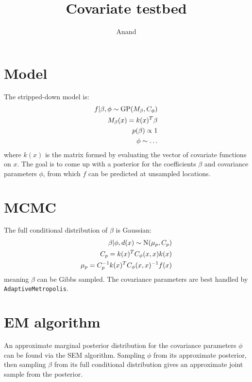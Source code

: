 \documentclass[a4paper]{article}
\begin{document}
\title{Covariate testbed}
\author{Anand}
\maketitle

\section{Model} %
\label{sec:model}

The stripped-down model is:
\begin{eqnarray*}
    f|\beta,\phi \sim \textup{GP}(M_\beta,C_\phi) \\
    M_\beta(x) = k(x)^T \beta\\
    p(\beta)\propto 1\\
    \phi\sim\ldots\\
\end{eqnarray*}
where $k(x)$ is the matrix formed by evaluating the vector of covariate functions on $x$. The goal is to come up with a posterior for the coefficients $\beta$ and covariance parameters $\phi$, from which $f$ can be predicted at unsampled locations.


\section{MCMC} %
\label{sec:mcmc}
The full conditional distribution of $\beta$ is Gaussian:
\begin{eqnarray*}
    \beta|\phi,d(x)\sim\textup{N}(\mu_p,C_p)\\
    C_p=k(x)^TC_\phi(x,x)k(x)\\
    \mu_p=C_p^{-1}k(x)^TC_\phi(x,x)^{-1}f(x)
\end{eqnarray*}
meaning $\beta$ can be Gibbs sampled. The covariance parameters are best handled by \texttt{AdaptiveMetropolis}. 

\section{EM algorithm} %
\label{sec:em_algorithm}
An approximate marginal posterior distribution for the covariance parameters $\phi$ can be found via the SEM algorithm. Sampling $\phi$ from its approximate posterior, then sampling $\beta$ from its full conditional distribution gives an approximate joint sample from the posterior.
\end{document}
